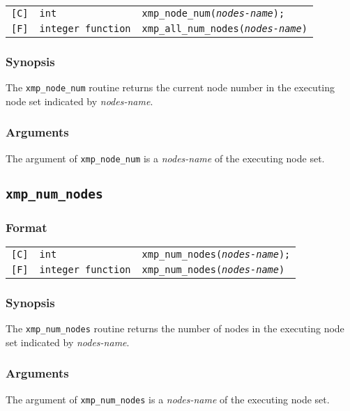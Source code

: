 \begin{tabular}{lll}

\verb![C]!&  {\tt int}& {\tt xmp\_node\_num({\it nodes-name});}\\

\verb![F]!&  {\tt integer function}& {\tt xmp\_all\_num\_nodes({\it nodes-name})}

\end{tabular}

\subsubsection*{Synopsis}
     The {\tt xmp\_node\_num} routine returns the current node number 
     in the executing node set indicated by {\it nodes-name}.

\subsubsection*{Arguments}
     The argument of {\tt xmp\_node\_num} is a {\it nodes-name} of the executing node set.


\vspace{0.3cm}

\subsection{\tt xmp\_num\_nodes}

\subsubsection*{Format}

\begin{tabular}{lll}

\verb![C]!&  {\tt int}& {\tt xmp\_num\_nodes({\it nodes-name});}\\

\verb![F]!&  {\tt integer function}& {\tt xmp\_num\_nodes({\it nodes-name})}

\end{tabular}

\subsubsection*{Synopsis}
     The {\tt xmp\_num\_nodes} routine returns the number of nodes 
     in the executing node set indicated by {\it nodes-name}.

\subsubsection*{Arguments}
    The argument of {\tt xmp\_num\_nodes} is a {\it nodes-name} of the executing node set.


